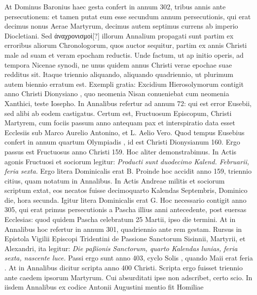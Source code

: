 At Dominus Baronius haec gesta confert in annum 302, tribus annis ante
persecutionem: et tamen putat eum esse secundum annum persecutionis,
qui erat decimus nonus Aerae Martyrum, decimus autem
septimus currens ab imperio Diocletiani.
Sed \textgreek{ἀναχρονισμοὶ[?]} illorum
Annalium propagati sunt partim ex erroribus aliorum Chronologorum,
quos auctor sequitur, partim ex annis Christi male ad
suam et veram epocham reductis.
%
Unde factum, ut ap initio operis,
ad tempora Nicenae synodi, ne unus quidem annus Christi
verae epochae suae redditus sit.
Itaque triennio aliquando, aliquando
quadriennio, ut plurimum autem biennio erratum est.
Exempli
gratia: Excidium Hierosolymorum contigit anno Christi
Dionysiano , quo neomenia Nisan conueniebat cum neomenia
Xanthici, teste Iosepho.
In Annalibus refertur ad annum
72: qui est error Eusebii, sed alibi ab eodem castigatus.
Certum est, Fructuosum Episcopum, Christi Martyrem, cum fociis
passum anno antequam pax et interspiratio data esset Ecclesiis
sub Marco Aurelio Antonino, et L. Aelio Vero.
Quod tempus Eusebius confert in annum quartum Olympiadis
 ,
id est Christi Dionysianum 160.
Ergo passus est Fructuosus anno Christi
159.
Hoc aliter demonstrabimus.
In Actis agonis Fructuosi et
sociorum legitur: \textit{Producti sunt duodecimo Kalend. Februarii, feria
sexta.}
Ergo litera Dominicalis erat B.
Proinde hoc accidit anno
159, triennio citius, quam notatum in Annalibus.
In Actis Andreae
militis et sociorum scriptum extat, eos necatos fuisse decimoquarto
Kalendas Septembris, Dominico die, hora secunda.
Igitur litera Dominicalis erat G.
Hoc necessario contigit anno 305,
qui erat primus persecutionis a Pascha illius anni antecedente, post
euersas Ecclesias: quod quidem Pascha celebratum 25 Martii, ipso
die termini.
At in Annalibus hoc refertur in annum 301, quadriennio
ante rem gestam.
Rursus in Epistola Vigilii Episcopi Tridentini
de Passione Sanctorum Sisinnii, Martyrii, et Alexandri,
ita legitur: \textit{Die paßionis Sanctorum, quarto Kalendas lunias, feria
sexta, nascente luce.}
Passi ergo sunt anno 403, cyclo Solis , quando
 Maii erat feria .
At in Annalibus dicitur scripta
anno 400 Christi.
Scripta ergo fuisset triennio ante caedem
ipsorum Martyrum.
Cui absurditati ipse non adscribet, certo scio.
In iisdem
Annalibus ex codice Antonii Augustini mentio fit Homiliae
